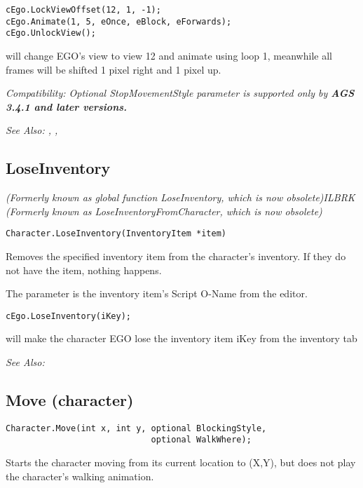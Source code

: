 \begin{verbatim}
cEgo.LockViewOffset(12, 1, -1);
cEgo.Animate(1, 5, eOnce, eBlock, eForwards);
cEgo.UnlockView();
\end{verbatim}
will change EGO's view to view 12 and animate using loop 1, meanwhile all frames will be
shifted 1 pixel right and 1 pixel up.

\it{Compatibility:} Optional \it{StopMovementStyle} parameter is supported only by \bf{AGS 3.4.1} and later versions.

\it{See Also:} ,
,


\subsection{LoseInventory}\label{Character.LoseInventory}%

\it{(Formerly known as global function LoseInventory, which is now obsolete)}ILBRK
\it{(Formerly known as LoseInventoryFromCharacter, which is now obsolete)}

\begin{verbatim}
Character.LoseInventory(InventoryItem *item)
\end{verbatim}
Removes the specified inventory item from the character's inventory.
If they do not have the item, nothing happens.

The parameter is the inventory item's Script O-Name from the editor.

\begin{verbatim}
cEgo.LoseInventory(iKey);
\end{verbatim}
will make the character EGO lose the inventory item iKey from the inventory tab

\it{See Also:} 


\subsection{Move (character)}\label{Character.Move}%

\begin{verbatim}
Character.Move(int x, int y, optional BlockingStyle,
                             optional WalkWhere);
\end{verbatim}
Starts the character moving from its current location to (X,Y), but does
not play the character's walking animation.


